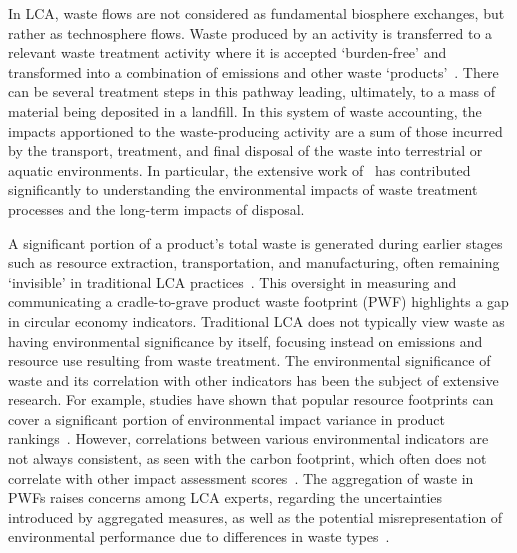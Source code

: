 In LCA, waste flows are not considered as fundamental biosphere exchanges, but rather as technosphere flows. Waste produced by an activity is transferred to a relevant waste treatment activity where it is accepted `burden-free' and transformed into a combination of emissions and other waste `products'~\citep{guinee2021wasteisnotaservice}. There can be several treatment steps in this pathway leading, ultimately, to a mass of material being deposited in a landfill. In this system of waste accounting, the impacts apportioned to the waste-producing activity are a sum of those incurred by the transport, treatment, and final disposal of the waste into terrestrial or aquatic environments. In particular, the extensive work of~\cite{doka2024publications} has contributed significantly to understanding the environmental impacts of waste treatment processes and the long-term impacts of disposal.

A significant portion of a product's total waste is generated during earlier stages such as resource extraction, transportation, and manufacturing, often remaining `invisible' in traditional LCA practices~\citep{laurenti2016wastefootprint}. This oversight in measuring and communicating a cradle-to-grave product waste footprint (PWF) highlights a gap in circular economy indicators. Traditional LCA does not typically view waste as having environmental significance by itself, focusing instead on emissions and resource use resulting from waste treatment. The environmental significance of waste and its correlation with other indicators has been the subject of extensive research. For example, studies have shown that popular resource footprints can cover a significant portion of environmental impact variance in product rankings~\citep{steinmann2017resourcefootprints}. However, correlations between various environmental indicators are not always consistent, as seen with the carbon footprint, which often does not correlate with other impact assessment scores~\citep{laurent2012carbonfootprint}. The aggregation of waste in PWFs raises concerns among LCA experts, regarding the uncertainties introduced by aggregated measures, as well as the potential misrepresentation of environmental performance due to differences in waste types~\citep{chen2021methoduncertainty,huijbregts2010energyfootprint}.


